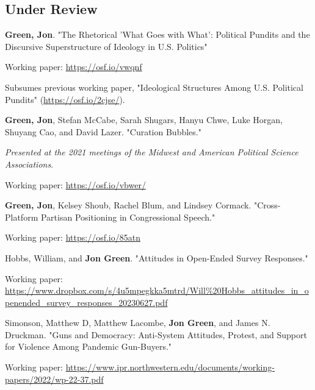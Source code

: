 \documentclass[letterpaper]{article}
\renewenvironment{itemize}{
  \begin{list}{}{
    \setlength{\leftmargin}{1.5em}
  }
}{
  \end{list}
}
\begin{document}
\subsection*{Under Review}
\begin{itemize}

\item \textbf{Green, Jon}. "The Rhetorical 'What Goes with What': Political Pundits and the Discursive Superstructure of Ideology in U.S. Politics" 
\begin{itemize}
\item Working paper: \url{https://osf.io/vwqnf}
\item Subsumes previous working paper, "Ideological Structures Among U.S. Political Pundits" (\url{https://osf.io/2cjse/}).
\end{itemize}

\item \textbf{Green, Jon}, Stefan McCabe, Sarah Shugars, Hanyu Chwe, Luke Horgan, Shuyang Cao, and David Lazer. "Curation Bubbles."
\begin{itemize}
\item \textit{Presented at the 2021 meetings of the Midwest and American Political Science Associations}.
\item Working paper: \url{https://osf.io/vbwer/}
\end{itemize} 

\item \textbf{Green, Jon}, Kelsey Shoub, Rachel Blum, and Lindsey Cormack. "Cross-Platform Partisan Positioning in Congressional Speech."
\begin{itemize}
\item Working paper: \url{https://osf.io/85atn}
\end{itemize}

\item Hobbs, William, and \textbf{Jon Green}. "Attitudes in Open-Ended Survey Responses."
\begin{itemize}
\item Working paper: \url{https://www.dropbox.com/s/4u5mpegkka5mtrd/Will\%20Hobbs_attitudes_in_openended_survey_responses_20230627.pdf}
\end{itemize}

\item Simonson, Matthew D, Matthew Lacombe, \textbf{Jon Green}, and James N. Druckman. "Guns and Democracy: Anti-System Attitudes, Protest, and Support for Violence Among Pandemic Gun-Buyers."
\begin{itemize}
\item Working paper: \url{https://www.ipr.northwestern.edu/documents/working-papers/2022/wp-22-37.pdf}
\end{itemize}


\end{itemize}
\end{document}
